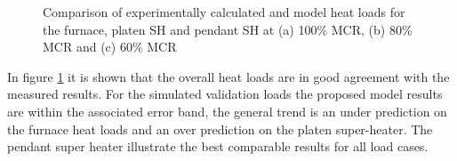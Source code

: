 \documentclass[review]{elsarticle}
\begin{document}
\begin{figure}[h!]
\caption{Comparison of experimentally calculated and model heat loads for the furnace, platen SH and pendant SH at (a) 100\% MCR, (b) 80\% MCR and (c) 60\% MCR}
\label{fig_heat_valid}
\end{figure}

In figure \ref{fig_heat_valid} it is shown that the overall heat loads are in good agreement with the measured results. For the simulated validation loads the proposed model results are within the associated error band, the general trend is an under prediction on the furnace heat loads and an over prediction on the platen super-heater. The pendant super heater illustrate the best comparable results for all load cases.\\
\end{document}
